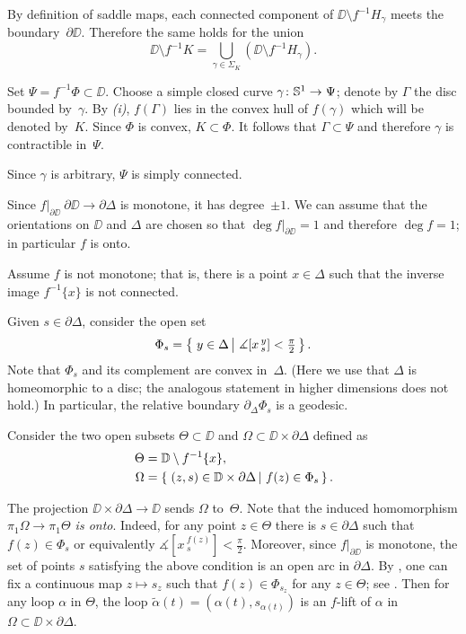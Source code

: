\documentclass{article}
\begin{document}
By definition of saddle maps, each connected component of $\DD\setminus f^{-1}H_\gamma$ meets the boundary~$\partial\DD$.
Therefore the same holds for the union
\[\DD\setminus f^{-1}K=\bigcup_{\gamma\in\Sigma_K}(\DD\setminus f^{-1}H_\gamma).\]

Set $\Psi=f^{-1}\Phi\subset\DD$.
Choose a simple closed curve $\gamma\colon\mathbb{S}^1\to\Psi$;
denote by $\Gamma$ the disc bounded by~$\gamma$.
By \textit{(i)}, $f(\Gamma)$ lies in the convex hull of $f(\gamma)$ which will be denoted by~$K$.
Since $\Phi$ is convex, $K\subset \Phi$.
It follows that $\Gamma\subset\Psi$ and therefore $\gamma$ is contractible in~$\Psi$.

Since $\gamma$ is arbitrary, $\Psi$ is simply connected.
\qeds

Since $f|_{\partial\DD}\:\partial\DD \to\partial \Delta$ is monotone, it has degree~$\pm1$.
We can assume that the orientations on $\DD$ and $\Delta$ are chosen so that $\deg f|_{\partial\DD}=1$
and therefore $\deg f=1$;
in particular $f$ is onto.

Assume $f$ is not monotone;
that is, there is a point $x\in \Delta$ such that the inverse image $f^{-1}\{x\}$ is not connected.

Given $s\in\partial \Delta$, consider the open set
\[\Phi_s=\set{y\in\Delta}{\measuredangle [x\,^y_s]<\tfrac\pi2}.\]
Note that $\Phi_s$ and its complement are convex in~$\Delta$.
(Here we use that $\Delta$ is homeomorphic to a disc; the analogous statement in higher dimensions does not hold.)
In particular, the relative boundary $\partial_\Delta\Phi_s$ is a geodesic.

Consider the two open subsets $\Theta\subset \DD$ and $\Omega\subset\DD\times\partial\Delta$ defined as
\begin{align*}
\Theta&=\DD\setminus f^{-1}\{x\},
\\
\Omega&=\set{(z,s)\in \DD\times\partial\Delta}{f(z)\in \Phi_s}.
\end{align*}

The projection $\DD\times\partial\Delta\to \DD$ sends $\Omega$ to~$\Theta$.
Note that the induced homomorphism \textit{$\pi_1\Omega\to \pi_1\Theta$ is onto}.
Indeed, for any point $z\in \Theta$ there is $s\in \partial\Delta$ such that $f(z)\in \Phi_s$ or equivalently $\measuredangle [x\,^{f(z)}_s]<\tfrac\pi2$.
Moreover, since $f|_{\partial\DD}$ is monotone, the set of points $s$ satisfying the above condition is an open arc in $\partial\Delta$.
By \cite[Theorem 2]{ungar}, one can fix a continuous map $z\mapsto s_z$ such that $f(z)\in \Phi_{s_z}$ for any $z\in \Theta$;
see .
Then for any loop $\alpha$ in $\Theta$, the loop $\tilde\alpha(t)=(\alpha(t),s_{\alpha(t)})$ is an $f$-lift of $\alpha$ in $\Omega\subset\DD\times\partial\Delta$.
\end{document}

